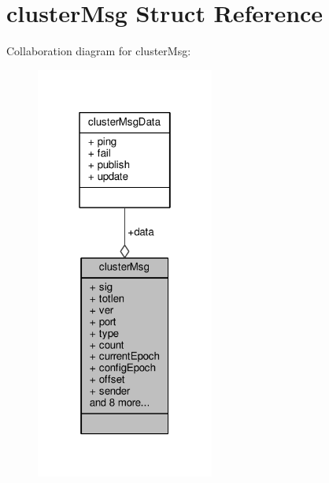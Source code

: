 \hypertarget{structclusterMsg}{}\section{cluster\+Msg Struct Reference}
\label{structclusterMsg}


Collaboration diagram for cluster\+Msg\+:\nopagebreak
\begin{figure}[H]
\begin{center}
\leavevmode
\includegraphics[width=166pt]{structclusterMsg__coll__graph}
\end{center}
\end{figure}
